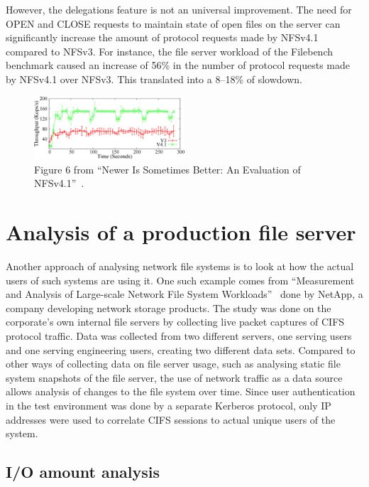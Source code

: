However, the delegations feature is not an universal improvement.
The need for OPEN and CLOSE requests to maintain state of open files on the server can significantly increase the amount of protocol requests made by NFSv4.1 compared to NFSv3.
For instance, the file server workload of the Filebench benchmark caused an increase of 56\% in the number of protocol requests made by NFSv4.1 over NFSv3.
This translated into a 8--18\% of slowdown.

\begin{figure}[h]
\centering\includegraphics[width=0.5\textwidth]{images/nfsv41better-reading-small-files.png}
\caption{Figure 6 from ``Newer Is Sometimes Better: An Evaluation of NFSv4.1''~\cite{NFSv4Better}.}
\label{fig:nfsv41randread}
\end{figure}

\section{Analysis of a production file server} \label{sect:NetAppAnalysis}

Another approach of analysing network file systems is to look at how the actual users of such systems are using it.
One such example comes from ``Measurement and Analysis of Large-scale Network File System Workloads''~\cite{NetApp} done by NetApp,
a company developing network storage products.
The study was done on the corporate's own internal file servers by collecting live packet captures of CIFS protocol traffic.
Data was collected from two different servers, one serving users and one serving engineering users, creating two different data sets.
Compared to other ways of collecting data on file server usage, such as analysing static file system snapshots of the file server,
the use of network traffic as a data source allows analysis of changes to the file system over time.
Since user authentication in the test environment was done by a separate Kerberos protocol,
only IP addresses were used to correlate CIFS sessions to actual unique users of the system.

\subsection{I/O amount analysis}

